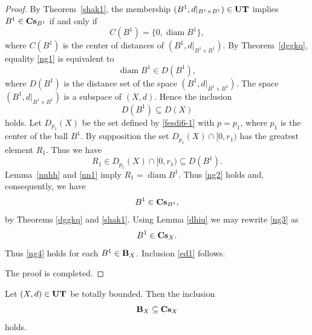 \documentclass{article}
\begin{document}
\begin{proof}
By Theorem~\ref{shak1}, the membership
\((B^{1},d|_{B^{1}\times B^{1}})\in {\bf UT}
\)
implies  \(B^{1}\in  {\bf Cs}_{B^1}\)  if and only if
\begin{equation}
    \label{ng1}
C(B^{1})=\{0,\operatorname{diam} B^{1}\},
\end{equation}
where $C(B^1)$ is the center of distances of $(B^1, d|_{B^1\times B^1})$.
By Theorem~\ref{dggkq}, equality \eqref{ng1} is equivalent to 
\begin{equation}
\label{ng2}
\operatorname{diam} B^{1} \in D(B^{1}),
\end{equation}
where \(D(B^{1})\) is the distance set of the space \((B^{1},d|_{B^{1}\times B^{1}})\).
The space \((B^{1},d|_{B^{1}\times B^{1}})\) is a subspace of \((X,d)\).
Hence the inclusion
\[
D(B^{1}) \subseteq D(X)
\]
holds. Let $D_{p_1}(X)$ be the set defined by \eqref{fesdi6-1} with $p=p_1$, where $p_1$ is the center of the ball $B^1$. By supposition the set $D_{p_1}(X)\cap [0,r_1)$  has the greatest element $R_1$. Thus we have 
\begin{equation*}
    R_1\in D_{p_1} (X)\cap [0,r_1) \subseteq D(B^1).
\end{equation*}
Lemma~\ref{nnhh} and \eqref{nn1} imply $R_1=\operatorname{diam}B^1$.
  Thus \eqref{ng2} holds and, consequently, we have
\begin{equation}
    \label{ng3}
 B^1\in {\bf Cs}_{B^{1}},
\end{equation}
by Theorems \ref{dggkq} and \ref{shak1}.
Using Lemma \ref{dhiu} we may rewrite \eqref{ng3} as
\begin{equation}
    \label{ng4}
B^1 \in {\bf Cs}_X. 
\end{equation}
Thus \eqref{ng4} holds for each \(B^{1}\in {\bf B}_X\).
Inclusion \eqref{ed1} follows.

The proof is completed.
\end{proof}











\begin{Corollary}\label{fjqp}
Let $(X,d)\in {\bf UT}$ be totally bounded. Then the inclusion
\[
{\bf B}_X \subseteq {\bf Cs}_X
\]
holds.
\end{Corollary}
\end{document}
